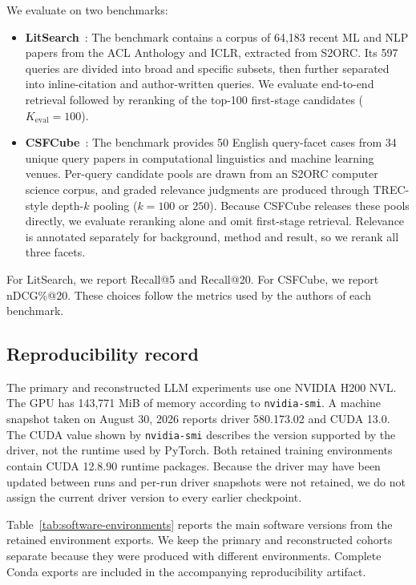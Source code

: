 \documentclass[pdflatex,sn-basic,Numbered]{sn-jnl}%
\theoremstyle{thmstyleone}%
\theoremstyle{thmstyletwo}%
\theoremstyle{thmstylethree}%
\begin{document}
We evaluate on two benchmarks:

\begin{itemize}
    \item \textbf{LitSearch}~\cite{Ajith}: The benchmark contains a corpus of
    64,183 recent ML and NLP papers from the ACL Anthology and ICLR, extracted
    from S2ORC. Its 597 queries are divided into broad and specific subsets, then
    further separated into inline-citation and author-written queries. We evaluate
    end-to-end retrieval followed by reranking of the top-100 first-stage candidates
    ($K_{\mathrm{eval}}=100$).

    \item \textbf{CSFCube}~\cite{Mysore}: The benchmark provides 50 English query-facet cases from 34 unique query
    papers in computational linguistics and machine learning venues.
    Per-query candidate pools are drawn from an S2ORC computer science corpus,
    and graded relevance judgments are produced through TREC-style depth-$k$
    pooling ($k = 100$ or $250$). Because CSFCube releases these pools directly,
    we evaluate reranking alone and omit first-stage retrieval. Relevance is
    annotated separately for background, method and result, so we rerank all three
    facets.
\end{itemize}

For LitSearch, we report Recall@5 and Recall@20. For CSFCube, we report
nDCG\%@20. These choices follow the metrics used by the authors of each
benchmark.

\subsection{Reproducibility record}
\label{sec:reproducibility}

The primary and reconstructed LLM experiments use one NVIDIA H200 NVL. The GPU
has 143,771 MiB of memory according to \texttt{nvidia-smi}. A machine snapshot
taken on August 30, 2026 reports driver 580.173.02 and CUDA 13.0. The CUDA value
shown by \texttt{nvidia-smi} describes the version supported by the driver, not
the runtime used by PyTorch. Both retained training environments contain CUDA
12.8.90 runtime packages. Because the driver may have been updated between runs
and per-run driver snapshots were not retained, we do not assign the current
driver version to every earlier checkpoint.

Table~\ref{tab:software-environments} reports the main software versions from the
retained environment exports. We keep the primary and reconstructed cohorts
separate because they were produced with different environments. Complete Conda
exports are included in the accompanying reproducibility artifact.
\end{document}
